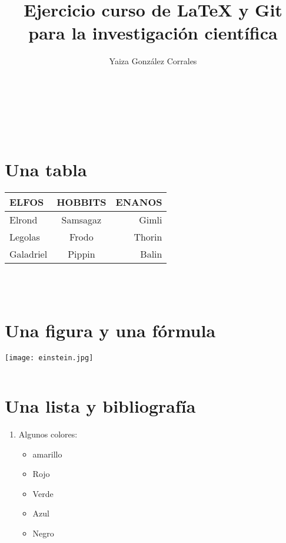 \documentclass[10pt,a4paper]{article}
\title{Ejercicio curso de \LaTeX{} y Git para la investigación científica}
\author{Yaiza González Corrales}
\begin{document}
\maketitle%
\\
\\
\\

\section{Una tabla}

\begin{tabular}[c]{|l|c|r|}
\hline
\textbf{ELFOS} & \textbf{HOBBITS}  & \textbf{ENANOS}\\
\hline
 Elrond & Samsagaz & Gimli\\
\hline
Legolas & Frodo &    Thorin\\
\hline
Galadriel & Pippin & Balin\\ 
\hline


\end{tabular}
\\
\\
\section{Una figura y una fórmula}

\texttt{[image: einstein.jpg]}

\begin{equation}
[E=mc^2]
\end{equation}

\section{Una lista y bibliografía}
\begin{enumerate}
\item Algunos colores:
\begin{itemize}
\item amarillo
\item Rojo
\item Verde
\item Azul
\item Negro \cite{Libro1}
\end{itemize}
\end{enumerate}





\end{document}
